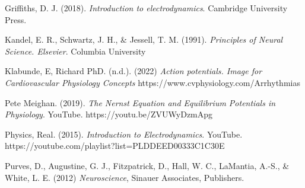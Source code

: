 \documentclass[english]{def}
\begin{document}
\begin{thebibliography}{9}

\bibitem{}Griffiths, D. J. (2018). \emph{Introduction to electrodynamics}. Cambridge University Press.

\bibitem{}
Kandel, E. R., Schwartz, J. H., \& Jessell, T. M. (1991). \emph{Principles of Neural Science. Elsevier}. Columbia University 

\bibitem{}
Klabunde, E, Richard PhD. (n.d.). (2022) \emph{Action potentials. Image for Cardiovascular Physiology Concepts} https://www.cvphysiology.com/Arrhythmias

\bibitem{}
Pete Meighan. (2019). \emph{The Nernst Equation and Equilibrium Potentials in Physiology}. YouTube. https://youtu.be/ZVUWyDzmApg

\bibitem{}
Physics, Real. (2015). \emph{Introduction to Electrodynamics}. YouTube. https://youtube.com/playlist?list=PLDDEED00333C1C30E 

\bibitem{}
Purves, D., Augustine, G. J., Fitzpatrick, D., Hall, W. C., LaMantia, A.-S., \& White, L. E. (2012) \emph{Neuroscience}, Sinauer Associates, Publishers.

 






\end{thebibliography}
\end{document}
